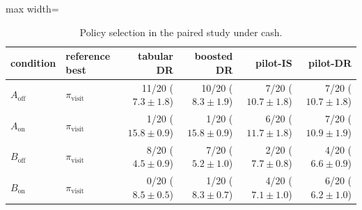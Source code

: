 \begin{table}[!htbp]
\centering
\caption{Policy selection in the paired study under cash.}
\label{tab:campaignselection_cash}
\footnotesize
\begin{adjustbox}{max width=\linewidth}
\begin{tabular}{llrrrr}
\toprule
condition & reference best & tabular DR & boosted DR & pilot-IS & pilot-DR \\
\midrule
$A_{\mathrm{off}}$ & $\pi_{\mathrm{visit}}$ & 11/20 ($7.3 \pm 1.8$) & 10/20 ($8.3 \pm 1.9$) & 7/20 ($10.7 \pm 1.8$) & 7/20 ($10.7 \pm 1.8$) \\
$A_{\mathrm{on}}$ & $\pi_{\mathrm{visit}}$ & 1/20 ($15.8 \pm 0.9$) & 1/20 ($15.8 \pm 0.9$) & 6/20 ($11.7 \pm 1.8$) & 7/20 ($10.9 \pm 1.9$) \\
$B_{\mathrm{off}}$ & $\pi_{\mathrm{visit}}$ & 8/20 ($4.5 \pm 0.9$) & 7/20 ($5.2 \pm 1.0$) & 2/20 ($7.7 \pm 0.8$) & 4/20 ($6.6 \pm 0.9$) \\
$B_{\mathrm{on}}$ & $\pi_{\mathrm{visit}}$ & 0/20 ($8.5 \pm 0.5$) & 1/20 ($8.3 \pm 0.7$) & 4/20 ($7.1 \pm 1.0$) & 6/20 ($6.2 \pm 1.0$) \\
\bottomrule
\end{tabular}
\end{adjustbox}
\end{table}
